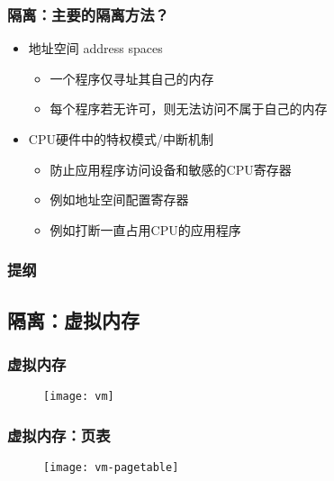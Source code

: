 \begin{frame}
	\frametitle{隔离：\small{主要的隔离方法？}}
		\begin{itemize}
			\item 地址空间 address spaces
				\begin{itemize}
				\item 一个程序仅寻址其自己的内存
				\item 每个程序若无许可，则无法访问不属于自己的内存
				\end{itemize}			
				\pause
			
			\item CPU硬件中的特权模式/中断机制
				\begin{itemize}
				\item 防止应用程序访问设备和敏感的CPU寄存器
				\item 例如地址空间配置寄存器
				\item 例如打断一直占用CPU的应用程序
				\end{itemize}				
		\end{itemize}
\end{frame}

\begin{frame}
    \frametitle{提纲} 
    \tableofcontents 
\end{frame}

\subsection{隔离：虚拟内存}

\begin{frame}[plain]
	
	\frametitle{虚拟内存}
	
	\begin{figure}
		\centering
		\texttt{[image: vm]}
	\end{figure}
	
\end{frame}

\begin{frame}[plain]
	
	\frametitle{虚拟内存：页表}
	
	\begin{figure}
		\centering
		\texttt{[image: vm-pagetable]}
	\end{figure}
	
\end{frame}

